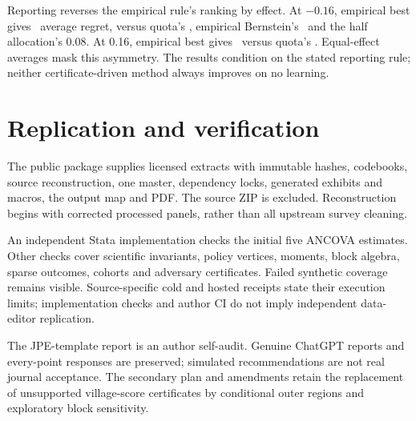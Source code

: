 \documentclass[11pt]{article}
\begin{document}
Reporting reverses the empirical rule's ranking by effect. At $-0.16$, empirical best gives \BenchmarkEmpiricalSelectedNegativeRegret\ average regret, versus quota's \BenchmarkQuotaSelectedNegativeRegret, empirical Bernstein's \BenchmarkEBSelectedNegativeRegret\ and the half allocation's 0.08. At 0.16, empirical best gives \BenchmarkEmpiricalSelectedPositiveRegret\ versus quota's \BenchmarkQuotaSelectedPositiveRegret. Equal-effect averages mask this asymmetry. The results condition on the stated reporting rule; neither certificate-driven method always improves on no learning.

\section{Replication and verification}
The public package supplies licensed extracts with immutable hashes, codebooks, source reconstruction, one master, dependency locks, generated exhibits and macros, the output map and PDF. The source ZIP is excluded. Reconstruction begins with corrected processed panels, rather than all upstream survey cleaning.

An independent Stata implementation checks the initial five ANCOVA estimates. Other checks cover scientific invariants, policy vertices, moments, block algebra, sparse outcomes, cohorts and adversary certificates. Failed synthetic coverage remains visible. Source-specific cold and hosted receipts state their execution limits; implementation checks and author CI do not imply independent data-editor replication.

The JPE-template report is an author self-audit. Genuine ChatGPT reports and every-point responses are preserved; simulated recommendations are not real journal acceptance. The secondary plan and amendments retain the replacement of unsupported village-score certificates by conditional outer regions and exploratory block sensitivity.
\end{document}
